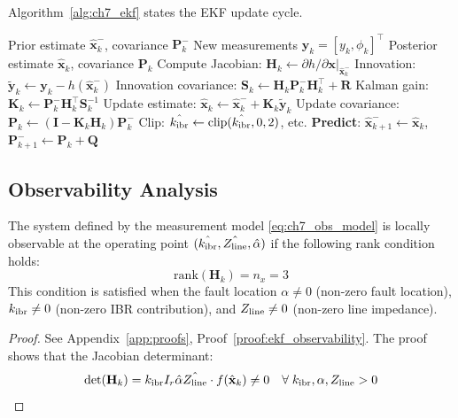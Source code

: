 Algorithm~\ref{alg:ch7_ekf} states the EKF update cycle.

\begin{algorithm}[htbp]
\caption{EKF State Estimation (C11)}
\label{alg:ch7_ekf}
\begin{algorithmic}[1]
\Require Prior estimate $\hat{\mathbf{x}}^-_{k}$, covariance $\mathbf{P}^-_k$
\Require New measurements $\mathbf{y}_k = [y_k, \phi_k]^\top$
\Ensure Posterior estimate $\hat{\mathbf{x}}_k$, covariance $\mathbf{P}_k$
\State Compute Jacobian: $\mathbf{H}_k \leftarrow \partial h/\partial \mathbf{x}|_{\hat{\mathbf{x}}^-_k}$
\State Innovation: $\tilde{\mathbf{y}}_k \leftarrow \mathbf{y}_k - h(\hat{\mathbf{x}}^-_k)$
\State Innovation covariance: $\mathbf{S}_k \leftarrow \mathbf{H}_k \mathbf{P}^-_k \mathbf{H}_k^\top + \mathbf{R}$
\State Kalman gain: $\mathbf{K}_k \leftarrow \mathbf{P}^-_k \mathbf{H}_k^\top \mathbf{S}_k^{-1}$
\State Update estimate: $\hat{\mathbf{x}}_k \leftarrow \hat{\mathbf{x}}^-_k + \mathbf{K}_k \tilde{\mathbf{y}}_k$
\State Update covariance: $\mathbf{P}_k \leftarrow (\mathbf{I} - \mathbf{K}_k \mathbf{H}_k)\mathbf{P}^-_k$
\State Clip: $\hat{k_\mathrm{ibr}} \leftarrow \mathrm{clip}(\hat{k_\mathrm{ibr}}, 0, 2)$, etc.
\State \textbf{Predict}: $\hat{\mathbf{x}}^-_{k+1} \leftarrow \hat{\mathbf{x}}_k$, \; $\mathbf{P}^-_{k+1} \leftarrow \mathbf{P}_k + \mathbf{Q}$
\end{algorithmic}
\end{algorithm}

\subsection{Observability Analysis}
\label{sec:ch7_observability}

\begin{proposition}
\label{prop:ch7_observability}
The system defined by the measurement model \eqref{eq:ch7_obs_model}
is locally observable at the operating point $(\hat{k_\mathrm{ibr}}, \hat{Z_\mathrm{line}}, \hat{\alpha})$
if the following rank condition holds:
\begin{equation}
  \mathrm{rank}(\mathbf{H}_k) = n_x = 3
  \label{eq:ch7_observability}
\end{equation}
This condition is satisfied when the fault location $\alpha \neq 0$
(non-zero fault location), $k_\mathrm{ibr} \neq 0$ (non-zero IBR contribution),
and $Z_\mathrm{line} \neq 0$ (non-zero line impedance).
\end{proposition}

\begin{proof}
See Appendix~\ref{app:proofs}, Proof~\ref{proof:ekf_observability}.
The proof shows that the Jacobian determinant:
\begin{equation}
  \det(\mathbf{H}_k) = k_\mathrm{ibr} I_r \hat{\alpha} \hat{Z_\mathrm{line}}
    \cdot f(\hat{\mathbf{x}}_k) \neq 0
    \quad\forall\; k_\mathrm{ibr}, \alpha, Z_\mathrm{line} > 0
  \label{eq:ch7_det}
\end{equation}
\end{proof}

